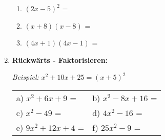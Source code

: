 \begin{enumerate}[label=\arabic*.,resume]
\begin{enumerate}[label=\alph*)]
        \item $(2x - 5)^2$ = \underline{\hspace{6cm}}

        \vspace{0.8cm}

        \item $(x + 8)(x - 8)$ = \underline{\hspace{6cm}}

        \vspace{0.8cm}

        \item $(4x + 1)(4x - 1)$ = \underline{\hspace{6cm}}

    \end{enumerate}

    \vspace{1cm}

    \item \textbf{Rückwärts - Faktorisieren:}

    \textit{Beispiel:} $x^2 + 10x + 25 = (x + 5)^2$

    \vspace{0.5cm}
    \begin{tabular}{ll}
        a) $x^2 + 6x + 9$ = \underline{\hspace{4cm}} & b) $x^2 - 8x + 16$ = \underline{\hspace{4cm}} \\[2ex]
        c) $x^2 - 49$ = \underline{\hspace{4cm}} & d) $4x^2 - 16$ = \underline{\hspace{4cm}} \\[2ex]
        e) $9x^2 + 12x + 4$ = \underline{\hspace{4cm}} & f) $25x^2 - 9$ = \underline{\hspace{4cm}}
    \end{tabular}

\end{enumerate}